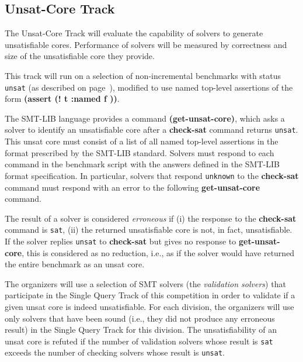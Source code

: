 \documentclass[12pt]{article}
\newcommand{\akey}[1]{\textbf{#1}\xspace}
\newcommand{\maintrack}{Single Query Track\xspace}
\newcommand{\inctrack}{Incremental Track\xspace}
\newcommand{\ucoretrack}{Unsat-Core Track\xspace}
\begin{document}

\subsection{\ucoretrack}
\label{sec:exec:unsat-core}

The \ucoretrack will evaluate the capability of solvers to generate
unsatisfiable cores.  Performance of solvers will be measured by correctness
and size of the unsatisfiable core they provide.

This track will run on a selection of non-incremental benchmarks with status
\texttt{unsat} (as described on page~\pageref{benchmark-selection}), modified
to use named top-level assertions of the form \akey{(assert (! t :named f ))}.


The SMT-LIB language provides a command \akey{(get-unsat-core)}, which asks
a solver to identify an unsatisfiable core after a \akey{check-sat}
command returns \texttt{unsat}.
This unsat core must consist of a list of all named top-level
assertions in the format prescribed by the SMT-LIB standard.
%
Solvers must respond to each command in the benchmark script with the
answers defined in the SMT-LIB format specification.  In particular,
solvers that respond \texttt{unknown} to the \akey{check-sat} command
must respond with an error to the following \akey{get-unsat-core}
command.

The result of a solver is considered \emph{erroneous} if (i) the
response to the \akey{check-sat} command is \texttt{sat}, (ii) the
returned unsatisfiable core is not, in fact, unsatisfiable.
%
If the solver replies \texttt{unsat} to \akey{check-sat} but gives no
response to \akey{get-unsat-core}, this is considered as no reduction, i.e.,
as if the solver would have returned the entire benchmark as an unsat
core.

The organizers will use a selection of SMT solvers (the \emph{validation
solvers}) that participate in the \maintrack of this competition in order to
validate if a given unsat core is indeed unsatisfiable.  For each division, the
organizers will use only solvers that have been sound (i.e., they did not
produce any erroneous result) in the \maintrack for this division.  The
unsatisfiability of an unsat core is refuted if the number of validation
solvers whose result is \texttt{sat} exceeds the number of checking solvers
whose result is \texttt{unsat}.
\end{document}
